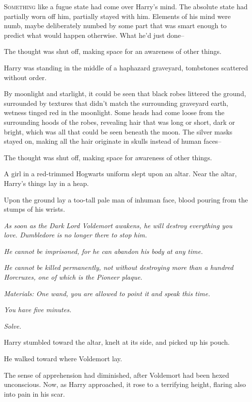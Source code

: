 
\lettrine{S}{omething} like a fugue state had come over Harry's mind. The absolute state had partially worn off him, partially stayed with him. Elements of his mind were numb, maybe deliberately numbed by some part that was smart enough to predict what would happen otherwise. What he'd just done\---

The thought was shut off, making space for an awareness of other things.

Harry was standing in the middle of a haphazard graveyard, tombstones scattered without order.

By moonlight and starlight, it could be seen that black robes littered the ground, surrounded by textures that didn't match the surrounding graveyard earth, wetness tinged red in the moonlight. Some heads had come loose from the surrounding hoods of the robes, revealing hair that was long or short, dark or bright, which was all that could be seen beneath the moon. The silver masks stayed on, making all the hair originate in skulls instead of human faces\---

The thought was shut off, making space for awareness of other things.

A girl in a red-trimmed Hogwarts uniform slept upon an altar. Near the altar, Harry's things lay in a heap.

Upon the ground lay a too-tall pale man of inhuman face, blood pouring from the stumps of his wrists.

\emph{As soon as the Dark Lord Voldemort awakens, he will destroy everything you love. Dumbledore is no longer there to stop him.}

\emph{He cannot be imprisoned, for he can abandon his body at any time.}

\emph{He cannot be killed permanently, not without destroying more than a hundred Horcruxes, one of which is the Pioneer plaque.}

\emph{Materials: One wand, you are allowed to point it and speak this time.}

\emph{You have five minutes.}

\emph{Solve.}

Harry stumbled toward the altar, knelt at its side, and picked up his pouch.

He walked toward where Voldemort lay.

The sense of apprehension had diminished, after Voldemort had been hexed unconscious. Now, as Harry approached, it rose to a terrifying height, flaring also into pain in his scar.

